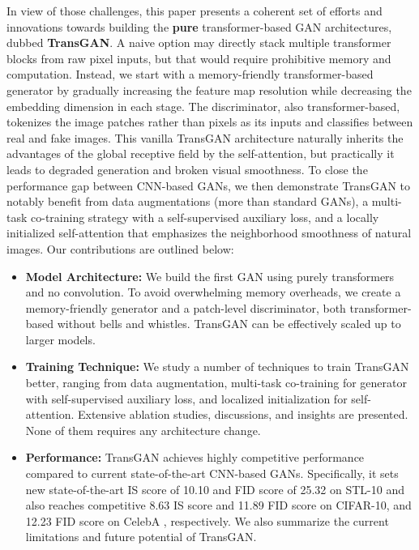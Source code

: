 \documentclass{article}
\begin{document}
In view of those challenges, this paper presents a coherent set of efforts and innovations towards building the \textbf{pure} transformer-based GAN architectures, dubbed \textbf{TransGAN}. A naive option may directly stack multiple transformer blocks from raw pixel inputs, but that would require prohibitive memory and computation.  Instead, we start with a memory-friendly transformer-based generator by gradually increasing the feature map resolution while decreasing the embedding dimension in each stage. The discriminator, also transformer-based, tokenizes the image patches rather than pixels as its inputs and classifies between real and fake images. This vanilla TransGAN architecture naturally inherits the advantages of the global receptive field by the self-attention, but practically it leads to degraded generation and broken visual smoothness. To close the performance gap between CNN-based GANs, we then demonstrate TransGAN to notably benefit from data augmentations (more than standard GANs), a multi-task co-training strategy with a self-supervised auxiliary loss, and a locally initialized self-attention that emphasizes the neighborhood smoothness of natural images. Our contributions are outlined below:\vspace{-0.5em}
\begin{itemize}
    \item \textbf{Model Architecture:} We build the first GAN using purely transformers and no convolution. To avoid overwhelming memory overheads, we create a memory-friendly generator and a patch-level discriminator, both transformer-based without bells and whistles. TransGAN can be effectively scaled up to larger models.\vspace{-0.5em}
    \item \textbf{Training Technique:} We study a number of techniques to train TransGAN better, ranging from data augmentation, multi-task co-training for generator with self-supervised auxiliary loss, and localized initialization for self-attention. Extensive ablation studies, discussions, and insights are presented. None of them requires any architecture change.\vspace{-0.5em} 
    \item \textbf{Performance:} TransGAN achieves highly competitive performance compared to current state-of-the-art CNN-based GANs.  Specifically, it sets new state-of-the-art IS score of 10.10 and FID score of 25.32 on STL-10 and also reaches competitive 8.63 IS score and 11.89 FID score on CIFAR-10, and 12.23 FID score on CelebA , respectively. We also summarize the current limitations and future potential of TransGAN.\vspace{-0.5em}
\end{itemize}
\end{document}
